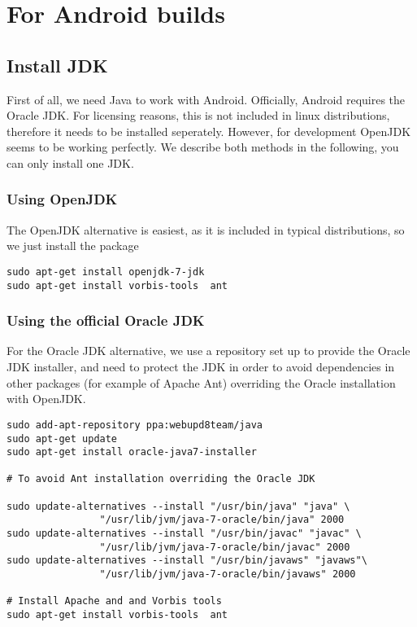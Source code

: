 \section{For Android  builds}
\subsection{Install JDK}
First of all, we need Java to work with Android. Officially, Android requires the Oracle JDK. For licensing reasons, this is not included in linux distributions, therefore it needs to be installed seperately.  However, for \xc development OpenJDK seems to be working perfectly. We describe both methods in the following, you can only install one JDK.

\subsubsection{Using OpenJDK}
The OpenJDK alternative is easiest, as it is included in typical distributions, so we just install the package
\begin{verbatim}
sudo apt-get install openjdk-7-jdk
sudo apt-get install vorbis-tools  ant
\end{verbatim}

\subsubsection{Using the official Oracle JDK}
For the Oracle JDK alternative, we use a repository set up to provide the Oracle JDK installer, and need to protect the JDK in order to avoid dependencies in other packages (for example of Apache Ant) overriding the Oracle installation with OpenJDK.

\begin{verbatim}
sudo add-apt-repository ppa:webupd8team/java
sudo apt-get update
sudo apt-get install oracle-java7-installer

# To avoid Ant installation overriding the Oracle JDK

sudo update-alternatives --install "/usr/bin/java" "java" \
                "/usr/lib/jvm/java-7-oracle/bin/java" 2000
sudo update-alternatives --install "/usr/bin/javac" "javac" \
                "/usr/lib/jvm/java-7-oracle/bin/javac" 2000
sudo update-alternatives --install "/usr/bin/javaws" "javaws"\
                "/usr/lib/jvm/java-7-oracle/bin/javaws" 2000

# Install Apache and and Vorbis tools
sudo apt-get install vorbis-tools  ant
\end{verbatim}


